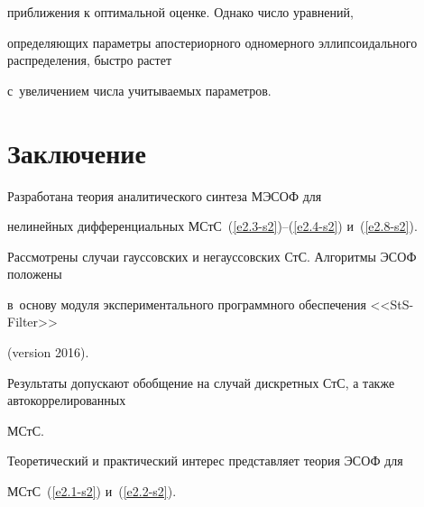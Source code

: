 приближения к оптимальной оценке. Однако число уравнений,

определяющих параметры апостериорного одномерного эллипсоидального распределения, быстро растет

с~увеличением числа учитываемых параметров.



\section{Заключение}



Разработана теория аналитического синтеза МЭСОФ для 

нелинейных дифференциальных МСтС~(\ref{e2.3-s2})--(\ref{e2.4-s2}) и~(\ref{e2.8-s2}). 

Рассмотрены случаи гауссовских и негауссовских СтС. Алгоритмы ЭСОФ положены 

в~основу модуля экспериментального программного обеспечения  <<StS-Filter>> 

(version 2016).



Результаты допускают обобщение на случай дискретных СтС, а также автокоррелированных 

МСтС.



Теоретический и практический интерес представляет теория  ЭСОФ для 

МСтС~(\ref{e2.1-s2}) и~(\ref{e2.2-s2}).



